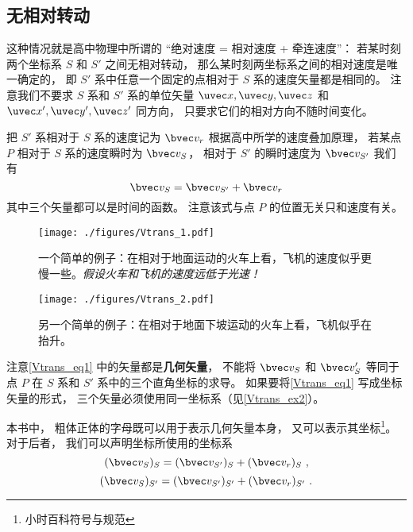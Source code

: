 


\subsection{无相对转动}
这种情况就是高中物理中所谓的 “绝对速度 = 相对速度 + 牵连速度”： 若某时刻两个坐标系 $S$ 和 $S'$ 之间无相对转动， 那么某时刻两坐标系之间的相对速度是唯一确定的， 即 $S'$ 系中任意一个固定的点相对于 $S$ 系的速度矢量都是相同的。 注意我们不要求 $S$ 系和 $S'$ 系的单位矢量 $\uvec x, \uvec y, \uvec z$ 和 $\uvec x', \uvec y', \uvec z'$ 同方向， 只要求它们的相对方向不随时间变化。

把 $S'$ 系相对于 $S$ 系的速度记为 $\bvec v_r$ 根据高中所学的速度叠加原理， 若某点 $P$ 相对于 $S$ 系的速度瞬时为 $\bvec v_S$， 相对于 $S'$ 的瞬时速度为 $\bvec v_{S'}$ 我们有
\begin{equation}\label{Vtrans_eq1}
\bvec v_{S} = \bvec v_{S'} + \bvec v_r
\end{equation}
其中三个矢量都可以是时间的函数。 注意该式与点 $P$ 的位置无关只和速度有关。

\begin{figure}[ht]
\centering
\texttt{[image: ./figures/Vtrans\_1.pdf]}
\caption{一个简单的例子：在相对于地面运动的火车上看，飞机的速度似乎更慢一些。\textsl{假设火车和飞机的速度远低于光速！}} \label{Vtrans_fig1}
\end{figure}

\begin{figure}[ht]
\centering
\texttt{[image: ./figures/Vtrans\_2.pdf]}
\caption{另一个简单的例子：在相对于地面下坡运动的火车上看，飞机似乎在抬升。} \label{Vtrans_fig2}
\end{figure}

注意\autoref{Vtrans_eq1} 中的矢量都是\textbf{几何矢量}， 不能将 $\bvec v_S$ 和 $\bvec v_S'$ 等同于点 $P$ 在 $S$ 系和 $S'$ 系中的三个直角坐标的求导。 如果要将\autoref{Vtrans_eq1} 写成坐标矢量的形式， 三个矢量必须使用同一坐标系（见\autoref{Vtrans_ex2}）。

本书中， 粗体正体的字母既可以用于表示几何矢量本身， 又可以表示其坐标\footnote{小时百科符号与规范}。 对于后者， 我们可以声明坐标所使用的坐标系
\begin{equation}\label{Vtrans_eq5}
(\bvec v_{S})_{S} = (\bvec v_{S'})_{S} + (\bvec v_r)_{S}~,
\end{equation}
\begin{equation}\label{Vtrans_eq6}
(\bvec v_{S})_{S'} = (\bvec v_{S'})_{S'} + (\bvec v_r)_{S'}~.
\end{equation}

